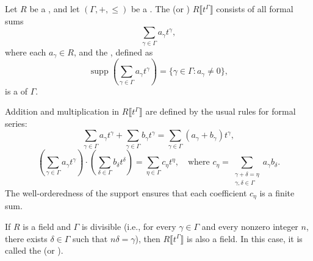 \begin{definition} \label{definition:hahn_series_over_a_commutative_ring_with_exponents_in_a_totally_ordered_abelian_group}
Let $R$ be a , and let $(\Gamma, +, \leq)$ be a . The  (or ) $R \llbracket t^\Gamma \rrbracket$ consists of all formal sums
$$\sum_{\gamma \in \Gamma} a_\gamma t^\gamma,$$
where each $a_\gamma \in R$, and the , defined as
$$\operatorname{supp}\left(\sum_{\gamma \in \Gamma} a_\gamma t^\gamma\right) = \{\gamma \in \Gamma : a_\gamma \neq 0\},$$
is a  of $\Gamma$.

Addition and multiplication in $R \llbracket t^\Gamma \rrbracket$ are defined by the usual rules for formal series:
$$\sum_{\gamma \in \Gamma} a_\gamma t^\gamma + \sum_{\gamma \in \Gamma} b_\gamma t^\gamma = \sum_{\gamma \in \Gamma} (a_\gamma + b_\gamma) t^\gamma,$$
$$\left(\sum_{\gamma \in \Gamma} a_\gamma t^\gamma\right) \cdot \left(\sum_{\delta \in \Gamma} b_\delta t^\delta\right) = \sum_{\eta \in \Gamma} c_\eta t^\eta, \quad \text{where } c_\eta = \sum_{\substack{\gamma + \delta = \eta \\ \gamma, \delta \in \Gamma}} a_\gamma b_\delta.$$
The well-orderedness of the support ensures that each coefficient $c_\eta$ is a finite sum.

If $R$ is a field and $\Gamma$ is divisible (i.e., for every $\gamma \in \Gamma$ and every nonzero integer $n$, there exists $\delta \in \Gamma$ such that $n\delta = \gamma$), then $R \llbracket t^\Gamma \rrbracket$ is also a field. In this case, it is called the  (or ).
\end{definition}
